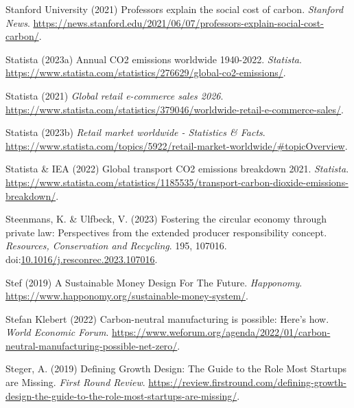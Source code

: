 \documentclass[
  letterpaper,
  DIV=11,
  numbers=noendperiod]{scrartcl}
\newlength{\cslhangindent}
\newenvironment{CSLReferences}[2] %
 {\begin{list}{}{%
  \setlength{\itemindent}{0pt}
  \setlength{\leftmargin}{0pt}
  \setlength{\parsep}{0pt}
  \ifodd #1
   \setlength{\leftmargin}{\cslhangindent}
   \setlength{\itemindent}{-1\cslhangindent}
  \fi
  \setlength{\itemsep}{#2\baselineskip}}}
 {\end{list}}
\begin{document}
\begin{CSLReferences}{0}{1}
Stanford University (2021) Professors explain the social cost of carbon.
\emph{Stanford News}.
\url{https://news.stanford.edu/2021/06/07/professors-explain-social-cost-carbon/}.

Statista (2023a) Annual {CO2} emissions worldwide 1940-2022.
\emph{Statista}.
\url{https://www.statista.com/statistics/276629/global-co2-emissions/}.

Statista (2021) \emph{Global retail e-commerce sales 2026}.
\url{https://www.statista.com/statistics/379046/worldwide-retail-e-commerce-sales/}.

Statista (2023b) \emph{Retail market worldwide - {Statistics} \&
{Facts}}.
\url{https://www.statista.com/topics/5922/retail-market-worldwide/\#topicOverview}.

Statista \& IEA (2022) Global transport {CO2} emissions breakdown 2021.
\emph{Statista}.
\url{https://www.statista.com/statistics/1185535/transport-carbon-dioxide-emissions-breakdown/}.

Steenmans, K. \& Ulfbeck, V. (2023) Fostering the circular economy
through private law: {Perspectives} from the extended producer
responsibility concept. \emph{Resources, Conservation and Recycling}.
195, 107016.
doi:\href{https://doi.org/10.1016/j.resconrec.2023.107016}{10.1016/j.resconrec.2023.107016}.

Stef (2019) A {Sustainable Money Design For The Future}.
\emph{Happonomy}.
\url{https://www.happonomy.org/sustainable-money-system/}.

Stefan Klebert (2022) Carbon-neutral manufacturing is possible: Here's
how. \emph{World Economic Forum}.
\url{https://www.weforum.org/agenda/2022/01/carbon-neutral-manufacturing-possible-net-zero/}.

Steger, A. (2019) Defining {Growth Design}: {The Guide} to the {Role
Most Startups} are {Missing}. \emph{First Round Review}.
\url{https://review.firstround.com/defining-growth-design-the-guide-to-the-role-most-startups-are-missing/}.


\end{CSLReferences}
\end{document}
